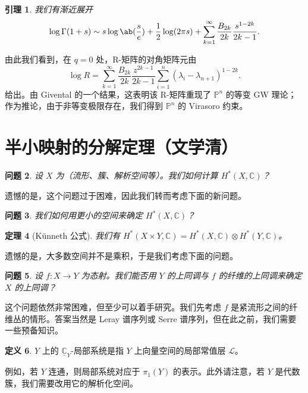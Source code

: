 \documentclass{amsart}
\newtheorem{thm}{定理}[section]
\newtheorem{lem}[thm]{引理}
\newtheorem{quest}[thm]{问题}
\theoremstyle{definition}
\newtheorem{defn}[thm]{定义}
\theoremstyle{remark}
\theoremstyle{plain}
\theoremstyle{definition}
\theoremstyle{remark}
\newcommand{\C}{\mathbb{C}}
\renewcommand{\P}{\mathbb{P}}
\newcommand{\mc}[1]{\mathcal{#1}}
\newcommand{\ul}[1]{\underline{#1}}
\newcommand{\1}{\mathbf{1}}
\newcommand{\2}{\mathbf{2}}
\newcommand{\3}{\mathbf{3}}
\begin{document}
\begin{lem}
    我们有渐近展开
    \[ \log \Gamma(1+s) \sim s \log \ab(\frac{s}{e}) + \frac{1}{2} \log(2\pi s) + \sum_{k=1}^{\infty} \frac{B_{2k}}{2k} \frac{s^{1-2k}}{2k-1}. \]
\end{lem}
由此我们看到，在 \(q = 0\) 处，R-矩阵的对角矩阵元由
\[ \log R = \sum_{k=1}^{\infty} \frac{B_{2k}}{2k} \frac{z^{2k-1}}{2k-1} \sum_{i =1}^n (\lambda_i - \lambda_{n+1})^{1-2k}. \]
给出。由 Givental 的一个结果，这表明该 R-矩阵重现了 \(\P^n\) 的等变 GW 理论；作为推论，由于非等变极限存在，我们得到 \(\P^n\) 的 Virasoro 约束。


\section{半小映射的分解定理（文学清）}%
\label{sec:Decomposition theorem for semi-small maps (Xueqing Wen)}

\begin{quest}
    设 \(X\) 为（流形、簇、解析空间等）。我们如何计算 \(H^*(X, \C)\)？
\end{quest}

遗憾的是，这个问题过于困难，因此我们转而考虑下面的新问题。

\begin{quest}
    我们如何用更小的空间来确定 \(H^*(X, \C)\)？
\end{quest}

\begin{thm}[K\"unneth 公式]
    我们有 \(H^*(X \times Y, \C) = H^*(X, \C) \otimes H^*(Y, \C)\)。
\end{thm}

遗憾的是，大多数空间并不是乘积，于是我们考虑下面的问题。

\begin{quest}
    设 \(f \colon X \to Y\) 为态射。我们能否用 \(Y\) 的上同调与 \(f\) 的纤维的上同调来确定 \(X\) 的上同调？
\end{quest}

这个问题依然非常困难，但至少可以着手研究。我们先考虑 \(f\) 是紧流形之间的纤维丛的情形。答案当然是 Leray 谱序列或 Serre 谱序列，但在此之前，我们需要一些预备知识。

\begin{defn}
    \(Y\) 上的 \(\ul{\C}_Y\)-局部系统是指 \(Y\) 上向量空间的局部常值层 \(\mc{L}\)。
\end{defn}

例如，若 \(Y\) 连通，则局部系统对应于 \(\pi_1(Y)\) 的表示。此外请注意，若 \(Y\) 是代数簇，我们需要改用它的解析化空间。
\end{document}
